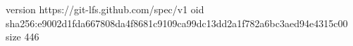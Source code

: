 version https://git-lfs.github.com/spec/v1
oid sha256:e9002d1fda667808da4f8681c9109ca99dc13dd2a1f782a6bc3aed94e4315c00
size 446
